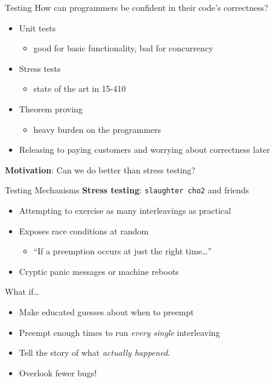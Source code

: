 \documentclass[xcolor=dvipsnames]{beamer}
\begin{document}
\begin{frame}{Testing}
	How can programmers be confident in their code's correctness?
	\begin{itemize}
		\item Unit tests
		\begin{itemize}
			\item good for basic functionality, bad for concurrency
		\end{itemize}
		\item Stress tests
		\begin{itemize}
			\item state of the art in 15-410
		\end{itemize}
		\item Theorem proving
		\begin{itemize}
			\item heavy burden on the programmers
		\end{itemize}
		\item Releasing to paying customers and worrying about correctness later
	\end{itemize}
	\linegap

	{\bf Motivation}: Can we do better than stress testing?
\end{frame}

\begin{frame}{Testing Mechanisms}
	\textbf{Stress testing}: \texttt{slaughter cho2} and friends
	\begin{itemize}
		\item Attempting to exercise as many interleavings as practical
		\item Exposes race conditions at random
		\begin{itemize}
			\item ``If a preemption occurs at just the right time\ldots''
		\end{itemize}
		\item Cryptic panic messages or machine reboots
	\end{itemize}
	\linegap
	What if\ldots
	\begin{itemize}
		\item Make educated guesses about when to preempt
		\item Preempt enough times to run {\em every single} interleaving
		\item Tell the story of what {\em actually happened}.
		\item Overlook fewer bugs!
	\end{itemize}
\end{frame}
\end{document}
